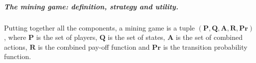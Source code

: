 \documentclass[a4paper,english,cleveref, autoref,numberwithinsect]{lipics-v2019}
\newcommand{\pr}{\mathbf{Pr}}
\newcommand{\bP}{\mathbf{P}}
\newcommand{\bA}{\mathbf{A}}
\newcommand{\bR}{\mathbf{R}}
\newcommand{\bQ}{\mathbf{Q}}
\begin{document}
\subparagraph*{The mining game: definition, strategy and utility.}
Putting together all the components,  
a mining game is a tuple $(\bP,\bQ,\bA,\bR,\pr)$, where $\bP$ is the set of players, $\bQ$ is the set of states, $\bA$ is the set of combined actions, $\bR$ is the combined pay-off function 
and $\pr$ is the transition probability function. 
\end{document}
